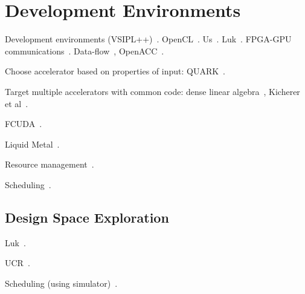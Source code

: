 \section{Development Environments}
\label{sec:dev}

Development environments (VSIPL++)~\cite{mlk12}.
OpenCL~\cite{Ahmed11}.
Us~\cite{blc17,cft+10,ctg+07,ftb+06,wcc12,wcc13}.
Luk~\cite{ttpl10}.
FPGA-GPU communications~\cite{brf14,tdm13,tdmp15}.
Data-flow~\cite{szb+12},
OpenACC~\cite{lkv16}.

Choose accelerator based on properties of input:
QUARK~\cite{hcy+14,hjl+15}.

Target multiple accelerators with common code:
dense linear algebra~\cite{daa+15},
Kicherer et al~\cite{knbk12}.

FCUDA~\cite{pgs+13}.

Liquid Metal~\cite{abb+12}.

Resource management~\cite{bdm+13}.

Scheduling~\cite{kl17,lp17}.

\subsection{Design Space Exploration}

Luk~\cite{ll12,ll11,slkk13}.

UCR~\cite{bbg13}.

Scheduling (using simulator)~\cite{blby11}.
